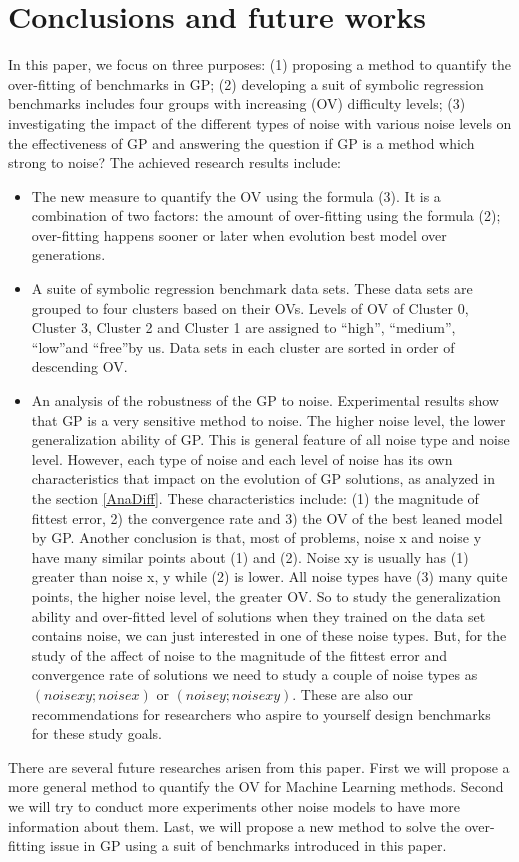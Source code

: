 \section {Conclusions and future works}
\label{Con}
In this paper, we focus on three purposes: (1) proposing a method to quantify the over-fitting of benchmarks in GP; (2) developing a suit of symbolic regression benchmarks includes four groups with increasing (OV) difficulty levels; (3)  investigating the impact of the different types of noise with various noise levels on the effectiveness of GP and answering the question if GP is a method which strong to noise? The achieved research results include:
\begin{itemize}
\item The new measure to quantify the OV using the formula (3). It is a combination of two factors: the amount of over-fitting using the formula (2); over-fitting happens sooner or later when evolution best model over generations.
\item A suite of symbolic regression benchmark data sets. These data sets are grouped to four clusters based on their OVs. Levels of OV of Cluster 0, Cluster 3, Cluster 2 and Cluster 1 are assigned to \textquotedblleft high\textquotedblright, \textquotedblleft medium\textquotedblright, \textquotedblleft low\textquotedblright and \textquotedblleft free\textquotedblright by us. Data sets in each cluster are sorted in order of descending OV.
\item An analysis of the robustness of the GP to noise. Experimental results show that GP is a very sensitive method to noise. The higher noise level, the lower generalization ability of GP. This is general feature of all noise type and noise level. However, each type of noise and each level of noise has its own characteristics that impact on the evolution of GP solutions, as analyzed in the section \ref{AnaDiff}. These characteristics include: (1) the magnitude of fittest error, 2) the convergence rate and 3) the OV of the best leaned model by GP. Another conclusion is that, most of problems, noise x and noise y have many similar points about (1) and (2). Noise xy is usually has (1) greater than noise x, y while (2) is lower. All noise types have (3) many quite points, the higher noise level, the greater OV. So to study the generalization ability and over-fitted level of solutions when they trained on the data set contains noise, we can just interested in one of these noise types. But, for the study of the affect of noise to the magnitude of the fittest error and convergence rate of solutions we need to study a couple of noise types as $(noise xy; noise x)$ or $(noise y; noise xy)$. These are also our recommendations for researchers who aspire to yourself design benchmarks for these study goals.
\end{itemize} \par
There are several future researches arisen from this paper. First we will propose a more general method to quantify the OV for Machine Learning methods.  Second we will try to conduct more experiments other noise models to have more information about them. Last, we will propose a new method to solve the over-fitting issue in GP using a suit of benchmarks introduced in this paper.

